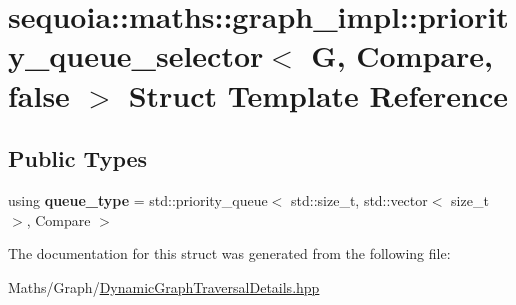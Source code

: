 \hypertarget{structsequoia_1_1maths_1_1graph__impl_1_1priority__queue__selector_3_01_g_00_01_compare_00_01false_01_4}{}\section{sequoia\+::maths\+::graph\+\_\+impl\+::priority\+\_\+queue\+\_\+selector$<$ G, Compare, false $>$ Struct Template Reference}
\label{structsequoia_1_1maths_1_1graph__impl_1_1priority__queue__selector_3_01_g_00_01_compare_00_01false_01_4}
\subsection*{Public Types}
\begin{DoxyCompactItemize}
\item 
\mbox{\label{structsequoia_1_1maths_1_1graph__impl_1_1priority__queue__selector_3_01_g_00_01_compare_00_01false_01_4_a2fdc92b3554efb1595fd6999c75f2207}} 
using {\bfseries queue\+\_\+type} = std\+::priority\+\_\+queue$<$ std\+::size\+\_\+t, std\+::vector$<$ size\+\_\+t $>$, Compare $>$
\end{DoxyCompactItemize}


The documentation for this struct was generated from the following file\+:\begin{DoxyCompactItemize}
\item 
Maths/\+Graph/\mbox{\hyperlink{_dynamic_graph_traversal_details_8hpp}{Dynamic\+Graph\+Traversal\+Details.\+hpp}}\end{DoxyCompactItemize}

